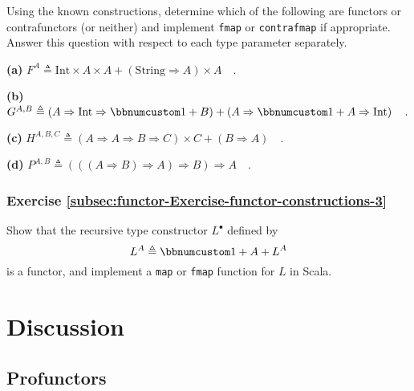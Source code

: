 Using the known constructions, determine which of the following are
functors or contrafunctors (or neither) and implement \lstinline!fmap!
or \lstinline!contrafmap! if appropriate. Answer this question with
respect to each type parameter separately.

\textbf{(a)} $F^{A}\triangleq\text{Int}\times A\times A+(\text{String}\Rightarrow A)\times A\quad.$

\textbf{(b)} $G^{A,B}\triangleq\left(A\Rightarrow\text{Int}\Rightarrow\bbnum 1+B\right)+\left(A\Rightarrow\bbnum 1+A\Rightarrow\text{Int}\right)\quad.$

\textbf{(c)} $H^{A,B,C}\triangleq\left(A\Rightarrow A\Rightarrow B\Rightarrow C\right)\times C+\left(B\Rightarrow A\right)\quad.$

\textbf{(d)} $P^{A,B}\triangleq\left(\left(\left(A\Rightarrow B\right)\Rightarrow A\right)\Rightarrow B\right)\Rightarrow A\quad.$

\subsubsection{Exercise \label{subsec:functor-Exercise-functor-constructions-3}\ref{subsec:functor-Exercise-functor-constructions-3}}

Show that the recursive type constructor $L^{\bullet}$ defined by
\[
L^{A}\triangleq\bbnum 1+A+L^{A}
\]
is a functor, and implement a \lstinline!map! or \lstinline!fmap!
function for $L$ in Scala.

\section{Discussion}

\subsection{Profunctors\label{subsec:f-Profunctors}}

